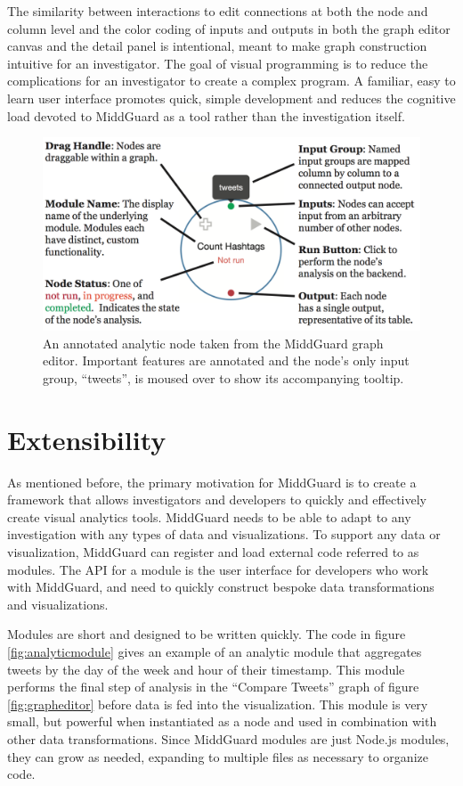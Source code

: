 \documentclass[midd]{thesis}
\begin{document}
The similarity between interactions to edit connections at both the node and
column level and the color coding of inputs and outputs in both the graph editor
canvas and the detail panel is intentional, meant to make graph construction
intuitive for an investigator. The goal of visual programming is to reduce the
complications for an investigator to create a complex program. A familiar, easy
to learn user interface promotes quick, simple development and reduces the
cognitive load devoted to MiddGuard as a tool rather than the investigation
itself.

\begin{figure}[!ht]
  \centering
  \includegraphics[width=1\textwidth]{middguard-analytic-node-annotated}
  \caption[An annotated analytic node.]{An annotated analytic node taken from
  the MiddGuard graph editor. Important features are annotated and the node's
  only input group, ``tweets'', is moused over to show its accompanying
  tooltip.}
  \label{fig:annotatednode}
\end{figure}

\section{Extensibility}

As mentioned before, the primary motivation for MiddGuard is to create a
framework that allows investigators and developers to quickly and effectively
create visual analytics tools. MiddGuard needs to be able to adapt to any
investigation with any types of data and visualizations. To support any data or
visualization, MiddGuard can register and load external code referred to as
modules. The API for a module is the user interface for developers who work with
MiddGuard, and need to quickly construct bespoke data transformations and
visualizations.

Modules are short and designed to be written quickly. The code in figure
\ref{fig:analyticmodule} gives an example of an analytic module that aggregates
tweets by the day of the week and hour of their timestamp. This module performs
the final step of analysis in the ``Compare Tweets'' graph of figure
\ref{fig:grapheditor} before data is fed into the visualization. This module is
very small, but powerful when instantiated as a node and used in combination
with other data transformations. Since MiddGuard modules are just Node.js
modules, they can grow as needed, expanding to multiple files as necessary to
organize code.
\end{document}

